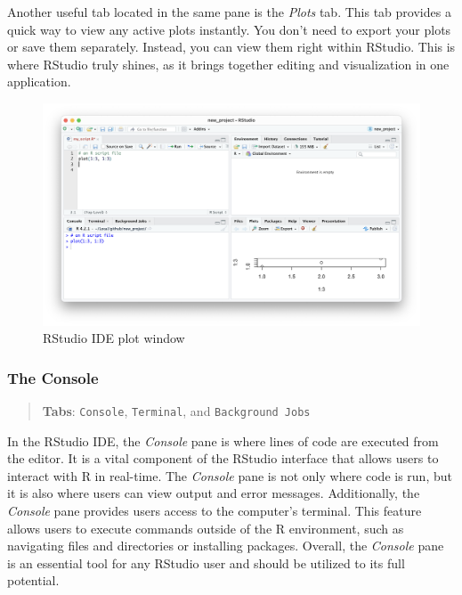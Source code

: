 \documentclass[
]{book}
\begin{document}
Another useful tab located in the same pane is the \emph{Plots} tab. This tab provides a quick way to view any active plots instantly. You don't need to export your plots or save them separately. Instead, you can view them right within RStudio. This is where RStudio truly shines, as it brings together editing and visualization in one application.

\begin{figure}
\includegraphics[width=31.94in]{images/02_024_qplot} \caption{\label{fig:2024}RStudio IDE plot window}\label{fig:2024}
\end{figure}

\hypertarget{the-console}{%
\subsubsection*{The Console}\label{the-console}}

\begin{quote}
\textbf{Tabs}: \texttt{Console}, \texttt{Terminal}, and \texttt{Background\ Jobs}
\end{quote}

In the RStudio IDE, the \emph{Console} pane is where lines of code are executed from the editor. It is a vital component of the RStudio interface that allows users to interact with R in real-time. The \emph{Console} pane is not only where code is run, but it is also where users can view output and error messages. Additionally, the \emph{Console} pane provides users access to the computer's terminal. This feature allows users to execute commands outside of the R environment, such as navigating files and directories or installing packages. Overall, the \emph{Console} pane is an essential tool for any RStudio user and should be utilized to its full potential.
\end{document}
